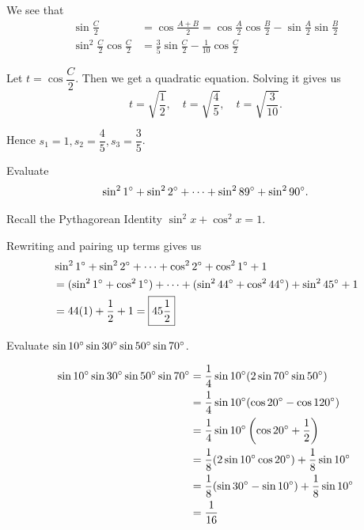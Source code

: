 \begin{solution}
We see that
\begin{align*}
\sin\frac{C}{2} &= \cos\frac{A+B}{2} = \cos\frac{A}{2}\cos\frac{B}{2}-\sin\frac{A}{2}\sin\frac{B}{2} \\
\sin^2\frac{C}{2}\cos\frac{C}{2} &= \frac{3}{5}\sin\frac{C}{2}-\frac{1}{10}\cos\frac{C}{2}
\end{align*}

Let $t=\cos\dfrac{C}{2}$. Then we get a quadratic equation. Solving it gives us 
\[ t=\sqrt{\frac{1}{2}}, \quad t=\sqrt{\frac{4}{5}}, \quad t=\sqrt{\frac{3}{10}}. \]

Hence $\boxed{s_1=1, s_2=\dfrac{4}{5}, s_3=\dfrac{3}{5}}$.
\end{solution}
\pagebreak

\begin{prbm}
Evaluate 
\[ \sin^2 1\degree + \sin^2 2\degree + \dots + \sin^2 89\degree + \sin^2 90\degree. \]
\end{prbm}

\begin{solution}
Recall the Pythagorean Identity $\sin^2 x + \cos^2 x = 1$.

Rewriting and pairing up terms gives us 
\begin{align*}
&\sin^2 1\degree + \sin^2 2\degree + \dots + \cos^2 2\degree + \cos^2 1\degree + 1 \\
&= (\sin^2 1\degree + \cos^2 1\degree) + \dots + (\sin^2 44\degree + \cos^2 44\degree) + \sin^2 45\degree + 1 \\
&= 44(1) + \frac{1}{2} + 1 = \boxed{45\frac{1}{2}}
\end{align*}
\end{solution}

\begin{prbm}
Evaluate $\sin10\degree\sin30\degree\sin50\degree\sin70\degree$.
\end{prbm}

\begin{solution}
\begin{align*}
\sin10\degree\sin30\degree\sin50\degree\sin70\degree
&= \frac{1}{4}\sin10\degree(2\sin70\degree\sin50\degree) \\
&= \frac{1}{4}\sin10\degree(\cos20\degree-\cos120\degree) \\
&= \frac{1}{4}\sin10\degree\left(\cos20\degree+\frac{1}{2}\right) \\
&= \frac{1}{8}(2\sin10\degree\cos20\degree)+\frac{1}{8}\sin10\degree \\
&= \frac{1}{8}(\sin30\degree-\sin10\degree)+\frac{1}{8}\sin10\degree \\
&= \frac{1}{16}
\end{align*}
\end{solution}
\pagebreak

